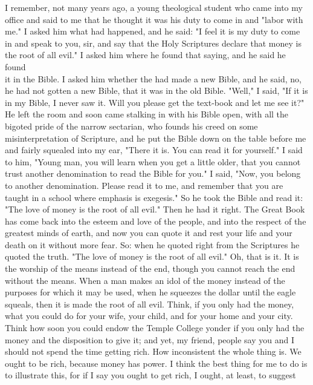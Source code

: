 \documentclass[10pt]{article}
\begin{document}
I remember, not many years ago, a young theological student who came into my office and said to me that he thought it was his duty to come in and "labor with me." I asked him what had happened, and he said: "I feel it is my duty to come in and speak to you, sir, and say that the Holy Scriptures declare that money is the root of all evil." I asked him where he found that saying, and he said he found\\
it in the Bible. I asked him whether the had made a new Bible, and he said, no, he had not gotten a new Bible, that it was in the old Bible. "Well," I said, "If it is in my Bible, I never saw it. Will you please get the text-book and let me see it?" He left the room and soon came stalking in with his Bible open, with all the bigoted pride of the narrow sectarian, who founds his creed on some misinterpretation of Scripture, and he put the Bible down on the table before me and fairly squealed into my ear, "There it is. You can read it for yourself." I said to him, "Young man, you will learn when you get a little older, that you cannot trust another denomination to read the Bible for you." I said, "Now, you belong to another denomination. Please read it to me, and remember that you are taught in a school where emphasis is exegesis." So he took the Bible and read it: "The love of money is the root of all evil." Then he had it right. The Great Book has come back into the esteem and love of the people, and into the respect of the greatest minds of earth, and now you can quote it and rest your life and your death on it without more fear. So: when he quoted right from the Scriptures he quoted the truth. "The love of money is the root of all evil." Oh, that is it. It is the worship of the means instead of the end, though you cannot reach the end without the means. When a man makes an idol of the money instead of the purposes for which it may be used, when he squeezes the dollar until the eagle squeals, then it is made the root of all evil. Think, if you only had the money, what you could do for your wife, your child, and for your home and your city. Think how soon you could endow the Temple College yonder if you only had the money and the disposition to give it; and yet, my friend, people say you and I should not spend the time getting rich. How inconsistent the whole thing is. We ought to be rich, because money has power. I think the best thing for me to do is to illustrate this, for if I say you ought to get rich, I ought, at least, to suggest\\
\end{document}
